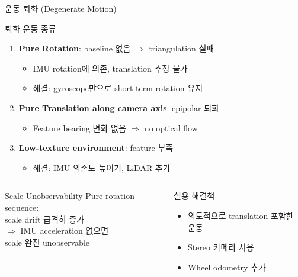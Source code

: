 \begin{frame}[shrink=10]{운동 퇴화 (Degenerate Motion)}
  \begin{block}{퇴화 운동 종류}
    \begin{enumerate}
      \item \textbf{Pure Rotation}: baseline 없음 $\Rightarrow$ triangulation 실패
        \begin{itemize}
          \item IMU rotation에 의존, translation 추정 불가
          \item 해결: gyroscope만으로 short-term rotation 유지
        \end{itemize}
      \item \textbf{Pure Translation along camera axis}: epipolar 퇴화
        \begin{itemize}
          \item Feature bearing 변화 없음 $\Rightarrow$ no optical flow
        \end{itemize}
      \item \textbf{Low-texture environment}: feature 부족
        \begin{itemize}
          \item 해결: IMU 의존도 높이기, LiDAR 추가
        \end{itemize}
    \end{enumerate}
  \end{block}
  \begin{columns}[T]
      \begin{alertblock}{Scale Unobservability}
        Pure rotation sequence:\\
        scale drift 급격히 증가\\
        $\Rightarrow$ IMU acceleration 없으면\\
        scale 완전 unobservable
      \end{alertblock}
      \begin{exampleblock}{실용 해결책}
        \begin{itemize}
          \item 의도적으로 translation 포함한 운동
          \item Stereo 카메라 사용
          \item Wheel odometry 추가
        \end{itemize}
      \end{exampleblock}
  \end{columns}
\end{frame}


